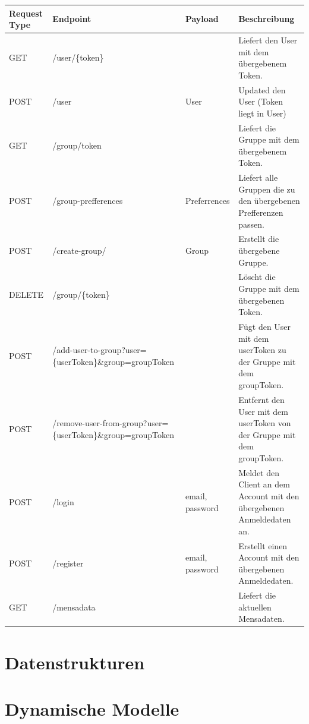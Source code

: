 \documentclass[a4paper]{scrreprt}
\begin{document}
\resizebox{16cm}{!} {
\begin{tabu} { | l | l | l | l | } 
 \hline
 Request Type & Endpoint & Payload & Beschreibung \\ [0.5ex] 
 \hline
 GET  & /user/\{token\} &  & Liefert den User mit dem übergebenem Token. \\ 
 
 POST & /user  & User & Updated den User (Token liegt in User) \\ 
 \hline
GET & /group/{token} & & Liefert die Gruppe mit dem übergebenem Token. \\
POST & /group-prefferences & Preferrences & Liefert alle Gruppen die zu den übergebenen Prefferenzen passen. \\
POST  & /create-group/  & Group & Erstellt die übergebene Gruppe. \\
DELETE  & /group/\{token\} & & Löscht die Gruppe mit dem übergebenen Token. \\

\hline 

POST  & /add-user-to-group?user=\{userToken\}\&group={groupToken} & & Fügt den User mit dem userToken zu der Gruppe mit dem groupToken. \\
POST  & /remove-user-from-group?user=\{userToken\}\&group={groupToken} & & Entfernt den User mit dem userToken von der Gruppe mit dem groupToken. \\

\hline

POST & /login & email, password & Meldet den Client an dem Account mit den übergebenen Anmeldedaten an. \\
POST & /register & email, password & Erstellt einen Account mit den übergebenen Anmeldedaten. \\

\hline

GET &  /mensadata & & Liefert die aktuellen Mensadaten.\\

\hline

\end{tabu}
}




\chapter{Datenstrukturen}

\chapter{Dynamische Modelle}
\end{document}
